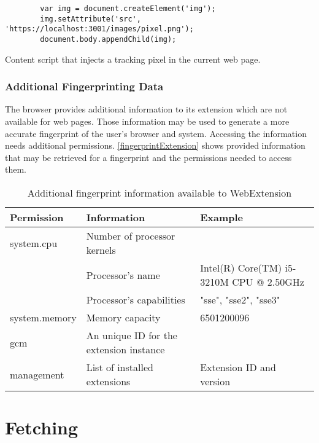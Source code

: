	\begin{code}
		\begin{lstlisting}
		var img = document.createElement('img');
		img.setAttribute('src', 'https://localhost:3001/images/pixel.png');
		document.body.appendChild(img);
		\end{lstlisting}
		\caption{Content script that injects a tracking pixel in the current web page.}
		\label{contentScriptWebBeacon}
	\end{code}
	
\subsubsection{Additional Fingerprinting Data} 
	
	The browser provides additional information to its extension which are not available for web pages. Those information may be used to generate a more accurate fingerprint of the user's browser and system. Accessing the information needs additional permissions. \autoref{fingerprintExtension} shows provided information that may be retrieved for a fingerprint and the permissions needed to access them. \\
	
	\begin{table}[h]
		\begin{tabular}{|l|l|l|} \hline
			\textbf{Permission} & \textbf{Information} & \textbf{Example} \\ \hline
			system.cpu & Number of processor kernels & \\
			& Processor's name & Intel(R) Core(TM) i5-3210M CPU @ 2.50GHz \\
			& Processor's capabilities & "sse", "sse2", "sse3"  \\ \hline
			system.memory & Memory capacity & 6501200096 \\ \hline
			gcm & An unique ID for the extension instance & \\ \hline
			management & List of installed extensions & Extension ID and version \\ \hline
		\end{tabular}
		\caption{Additional fingerprint information available to WebExtension}
		\label{fingerprintExtension}
	\end{table} 
	
\section{Fetching}
\label{sec:fetching}
	
